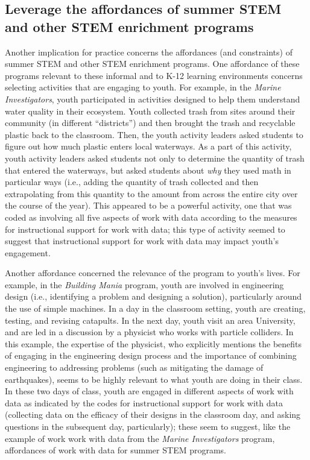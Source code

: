 \documentclass[]{msu-thesis}
\theoremstyle{definition}
\theoremstyle{definition}
\theoremstyle{definition}
\theoremstyle{remark}
\begin{document}
\subsection{Leverage the affordances of summer STEM and other STEM
enrichment
programs}\label{leverage-the-affordances-of-summer-stem-and-other-stem-enrichment-programs}

Another implication for practice concerns the affordances (and
constraints) of summer STEM and other STEM enrichment programs. One
affordance of these programs relevant to these informal and to K-12
learning environments concerns selecting activities that are engaging to
youth. For example, in the \emph{Marine Investigators}, youth
participated in activities designed to help them understand water
quality in their ecosystem. Youth collected trash from sites around
their community (in different ``districts'') and then brought the trash
and recyclable plastic back to the classroom. Then, the youth activity
leaders asked students to figure out how much plastic enters local
waterways. As a part of this activity, youth activity leaders asked
students not only to determine the quantity of trash that entered the
waterways, but asked students about \emph{why} they used math in
particular ways (i.e., adding the quantity of trash collected and then
extrapolating from this quantity to the amount from across the entire
city over the course of the year). This appeared to be a powerful
activity, one that was coded as involving all five aspects of work with
data according to the measures for instructional support for work with
data; this type of activity seemed to suggest that instructional support
for work with data may impact youth's engagement.

Another affordance concerned the relevance of the program to youth's
lives. For example, in the \emph{Building Mania} program, youth are
involved in engineering design (i.e., identifying a problem and
designing a solution), particularly around the use of simple machines.
In a day in the classroom setting, youth are creating, testing, and
revising catapults. In the next day, youth visit an area University, and
are led in a discussion by a physicist who works with particle
colliders. In this example, the expertise of the physicist, who
explicitly mentions the benefits of engaging in the engineering design
process and the importance of combining engineering to addressing
problems (such as mitigating the damage of earthquakes), seems to be
highly relevant to what youth are doing in their class. In these two
days of class, youth are engaged in different aspects of work with data
as indicated by the codes for instructional support for work with data
(collecting data on the efficacy of their designs in the classroom day,
and asking questions in the subsequent day, particularly); these seem to
suggest, like the example of work work with data from the \emph{Marine
Investigators} program, affordances of work with data for summer STEM
programs.
\end{document}
